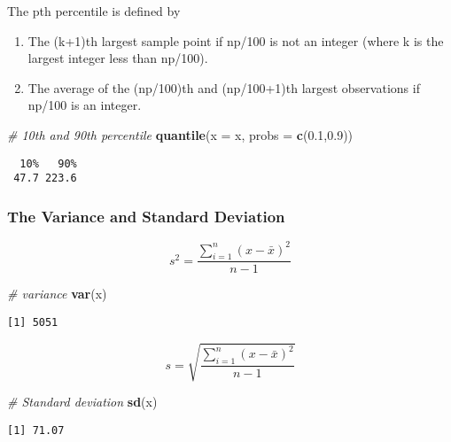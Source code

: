 \documentclass[12pt,]{article}
\newenvironment{Shaded}{\begin{snugshade}}{\end{snugshade}}
\newcommand{\KeywordTok}[1]{\textcolor[rgb]{0.13,0.29,0.53}{\textbf{#1}}}
\newcommand{\DataTypeTok}[1]{\textcolor[rgb]{0.13,0.29,0.53}{#1}}
\newcommand{\FloatTok}[1]{\textcolor[rgb]{0.00,0.00,0.81}{#1}}
\newcommand{\CommentTok}[1]{\textcolor[rgb]{0.56,0.35,0.01}{\textit{#1}}}
\newcommand{\NormalTok}[1]{#1}
\theoremstyle{definition}
\theoremstyle{definition}
\theoremstyle{definition}
\theoremstyle{remark}
\begin{document}
The pth percentile is defined by

\begin{enumerate}
\def\labelenumi{\arabic{enumi}.}
\item
  The (k+1)th largest sample point if np/100 is not an integer (where k
  is the largest integer less than np/100).
\item
  The average of the (np/100)th and (np/100+1)th largest observations if
  np/100 is an integer.
\end{enumerate}

\begin{Shaded}
\begin{Highlighting}[]
\CommentTok{# 10th and 90th percentile}
\KeywordTok{quantile}\NormalTok{(}\DataTypeTok{x =}\NormalTok{ x, }\DataTypeTok{probs =} \KeywordTok{c}\NormalTok{(}\FloatTok{0.1}\NormalTok{,}\FloatTok{0.9}\NormalTok{))}
\end{Highlighting}
\end{Shaded}

\begin{verbatim}
  10%   90% 
 47.7 223.6 
\end{verbatim}

\subsubsection{The Variance and Standard
Deviation}\label{the-variance-and-standard-deviation}

\[s^2 = \frac{\sum^n_{i=1}(x-\bar{x})^2}{n-1}\]

\begin{Shaded}
\begin{Highlighting}[]
\CommentTok{# variance}
\KeywordTok{var}\NormalTok{(x)}
\end{Highlighting}
\end{Shaded}

\begin{verbatim}
[1] 5051
\end{verbatim}

\[s = \sqrt{\frac{\sum^n_{i=1}(x-\bar{x})^2}{n-1}}\]

\begin{Shaded}
\begin{Highlighting}[]
\CommentTok{# Standard deviation}
\KeywordTok{sd}\NormalTok{(x)}
\end{Highlighting}
\end{Shaded}

\begin{verbatim}
[1] 71.07
\end{verbatim}
\end{document}
